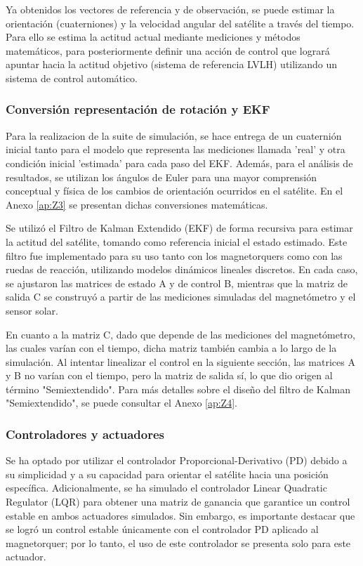 Ya obtenidos los vectores de referencia y de observación, se puede estimar la orientación (cuaterniones) y la velocidad angular del satélite a través del tiempo. Para ello se estima la actitud actual mediante mediciones y métodos matemáticos, para posteriormente definir una acción de control que logrará apuntar hacia la actitud objetivo (sistema de referencia LVLH) utilizando un sistema de control automático.

\subsubsection{Conversión representación de rotación y EKF}

Para la realizacion de la suite de simulación, se hace entrega de un cuaternión inicial tanto para el modelo que representa las mediciones llamada 'real' y otra condición inicial 'estimada' para cada paso del EKF. Además, para el análisis de resultados, se utilizan los ángulos de Euler para una mayor comprensión conceptual y física de los cambios de orientación ocurridos en el satélite. En el Anexo \ref{ap:Z3} se presentan dichas conversiones matemáticas.

Se utilizó el Filtro de Kalman Extendido (EKF) de forma recursiva para estimar la actitud del satélite, tomando como referencia inicial el estado estimado. Este filtro fue implementado para su uso tanto con los magnetorquers como con las ruedas de reacción, utilizando modelos dinámicos lineales discretos. En cada caso, se ajustaron las matrices de estado A y de control B, mientras que la matriz de salida C se construyó a partir de las mediciones simuladas del magnetómetro y el sensor solar.

En cuanto a la matriz C, dado que depende de las mediciones del magnetómetro, las cuales varían con el tiempo, dicha matriz también cambia a lo largo de la simulación. Al intentar linealizar el control en la siguiente sección, las matrices A y B no varían con el tiempo, pero la matriz de salida sí, lo que dio origen al término "Semiextendido". Para más detalles sobre el diseño del filtro de Kalman "Semiextendido", se puede consultar el Anexo \ref{ap:Z4}.

\subsubsection{Controladores y actuadores}

Se ha optado por utilizar el controlador Proporcional-Derivativo (PD) debido a su simplicidad y a su capacidad para orientar el satélite hacia una posición específica. Adicionalmente, se ha simulado el controlador Linear Quadratic Regulator (LQR) para obtener una matriz de ganancia que garantice un control estable en ambos actuadores simulados. Sin embargo, es importante destacar que se logró un control estable únicamente con el controlador PD aplicado al magnetorquer; por lo tanto, el uso de este controlador se presenta solo para este actuador.

